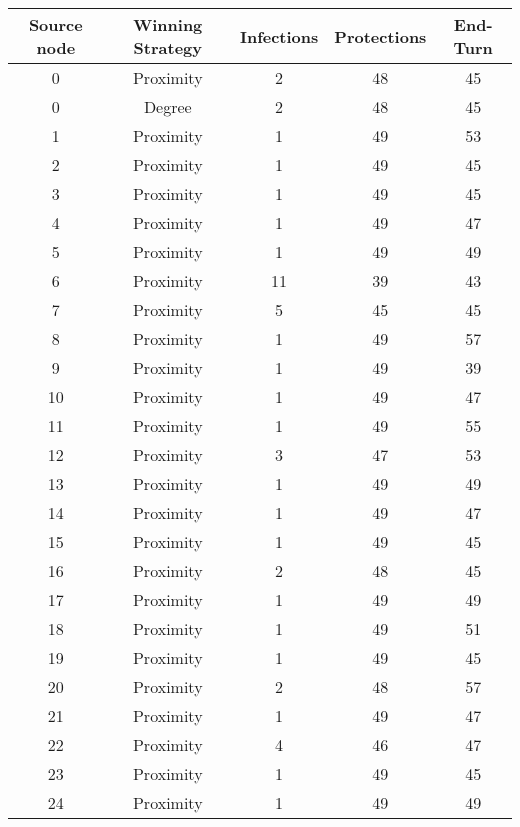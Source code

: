 \documentclass[results.tex]{subfiles}
\begin{document}
\begin{center}
  \begin{tabular}{| c || c | c | c | c |}
    \hline
    {\bfseries Source node} & {\bfseries Winning Strategy} & {\bfseries Infections} & {\bfseries Protections} & {\bfseries End-Turn} \\  %
    \hline\hline
    0 & Proximity & 2 & 48 & 45 \\ 
    \hline
    0 & Degree & 2 & 48 & 45 \\ 
    \hline
    1 & Proximity & 1 & 49 & 53 \\ 
    \hline
    2 & Proximity & 1 & 49 & 45 \\ 
    \hline
    3 & Proximity & 1 & 49 & 45 \\ 
    \hline
    4 & Proximity & 1 & 49 & 47 \\ 
    \hline
    5 & Proximity & 1 & 49 & 49 \\ 
    \hline
    6 & Proximity & 11 & 39 & 43 \\ 
    \hline
    7 & Proximity & 5 & 45 & 45 \\ 
    \hline
    8 & Proximity & 1 & 49 & 57 \\ 
    \hline
    9 & Proximity & 1 & 49 & 39 \\ 
    \hline
    10 & Proximity & 1 & 49 & 47 \\ 
    \hline
    11 & Proximity & 1 & 49 & 55 \\ 
    \hline
    12 & Proximity & 3 & 47 & 53 \\ 
    \hline
    13 & Proximity & 1 & 49 & 49 \\ 
    \hline
    14 & Proximity & 1 & 49 & 47 \\ 
    \hline
    15 & Proximity & 1 & 49 & 45 \\ 
    \hline
    16 & Proximity & 2 & 48 & 45 \\ 
    \hline
    17 & Proximity & 1 & 49 & 49 \\ 
    \hline
    18 & Proximity & 1 & 49 & 51 \\ 
    \hline
    19 & Proximity & 1 & 49 & 45 \\ 
    \hline
    20 & Proximity & 2 & 48 & 57 \\ 
    \hline
    21 & Proximity & 1 & 49 & 47 \\ 
    \hline
    22 & Proximity & 4 & 46 & 47 \\ 
    \hline
    23 & Proximity & 1 & 49 & 45 \\ 
    \hline
    24 & Proximity & 1 & 49 & 49 \\ 

\end{tabular}
\end{center}
\end{document}
